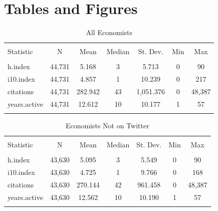 \documentclass[12pt, Times New Roman]{article}
\begin{document}
\vfill
\pagebreak{}
\begin{spacing}{1.0}


\end{spacing}

\vfill
\pagebreak{}
\clearpage

\section*{Tables and Figures}\label{sec:Tables and Figures}

\begin{table}[!htbp] \centering 
  \caption{All Economists} 
  \label{table1} 
\begin{tabular}{@{\extracolsep{5pt}}lcccccc} 
\\[-1.8ex]\hline 
\hline \\[-1.8ex] 
Statistic & \multicolumn{1}{c}{N} & \multicolumn{1}{c}{Mean} & \multicolumn{1}{c}{Median} & \multicolumn{1}{c}{St. Dev.} & \multicolumn{1}{c}{Min} & \multicolumn{1}{c}{Max} \\ 
\hline \\[-1.8ex] 
h.index & 44,731 & 5.168 & 3 & 5.713 & 0 & 90 \\ 
i10.index & 44,731 & 4.857 & 1 & 10.239 & 0 & 217 \\ 
citations & 44,731 & 282.942 & 43 & 1,051.376 & 0 & 48,387 \\ 
years.active & 44,731 & 12.612 & 10 & 10.177 & 1 & 57 \\ 
\hline \\[-1.8ex] 
\end{tabular} 
\end{table} 

\begin{table}[!htbp] \centering 
  \caption{Economists Not on Twitter} 
  \label{table2} 
\begin{tabular}{@{\extracolsep{5pt}}lcccccc} 
\\[-1.8ex]\hline 
\hline \\[-1.8ex] 
Statistic & \multicolumn{1}{c}{N} & \multicolumn{1}{c}{Mean} & \multicolumn{1}{c}{Median} & \multicolumn{1}{c}{St. Dev.} & \multicolumn{1}{c}{Min} & \multicolumn{1}{c}{Max} \\ 
\hline \\[-1.8ex] 
h.index & 43,630 & 5.095 & 3 & 5.549 & 0 & 90 \\ 
i10.index & 43,630 & 4.725 & 1 & 9.766 & 0 & 168 \\ 
citations & 43,630 & 270.144 & 42 & 961.458 & 0 & 48,387 \\ 
years.active & 43,630 & 12.562 & 10 & 10.190 & 1 & 57 \\ 
\hline \\[-1.8ex] 
\end{tabular} 
\end{table} 
\end{document}
